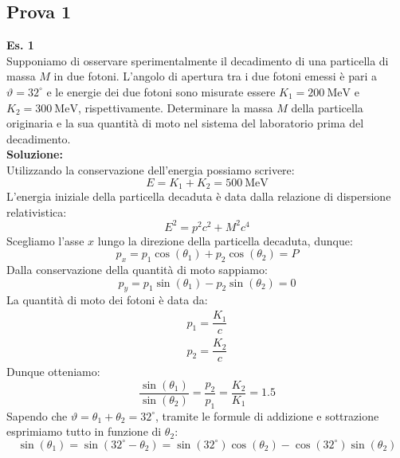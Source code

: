 \subsection{Prova 1}
\textbf{Es. 1}\\
Supponiamo di osservare sperimentalmente il decadimento di una particella di massa $M$ in due fotoni. L'angolo di apertura tra i due fotoni emessi è pari a $\vartheta = 32^\circ$ e le energie dei due fotoni
sono misurate essere $K_1 = \qty{200}{\mega\electronvolt}$ e $K_2 = \qty{300}{\mega\electronvolt}$, rispettivamente. Determinare la massa $M$ della particella originaria e la sua quantità di moto nel sistema del laboratorio prima del decadimento.\\
\textbf{Soluzione:}\\
Utilizzando la conservazione dell'energia possiamo scrivere:
\begin{equation}
    E = K_1 + K_2 = \qty{500}{\mega\electronvolt}
\end{equation}
L'energia iniziale della particella decaduta è data dalla relazione di dispersione relativistica:
\begin{equation}
    E^2 = p^2 c^2 + M^2 c^4
\end{equation}
Scegliamo l'asse $x$ lungo la direzione della particella decaduta, dunque:
\begin{equation}
    p_x = p_{1} \cos(\theta_1) + p_{2} \cos(\theta_2) = P
\end{equation}
Dalla conservazione della quantità di moto sappiamo:
\begin{equation}
    p_y = p_{1} \sin(\theta_1) - p_{2} \sin(\theta_2) = 0
\end{equation}
La quantità di moto dei fotoni è data da:
\begin{equation}
    \begin{split}
        p_{1} = \dfrac{K_{1}}{c} \\[8pt]
        p_{2} = \dfrac{K_{2}}{c}
    \end{split}
\end{equation}
Dunque otteniamo:
\begin{equation}
    \dfrac{\sin(\theta_1)}{\sin(\theta_2)} = \dfrac{p_{2}}{p_{1}} = \dfrac{K_{2}}{K_{1}} = 1.5
\end{equation}
Sapendo che $\vartheta = \theta_1 + \theta_2 = 32^\circ$, tramite le formule di addizione e sottrazione esprimiamo tutto in funzione di $\theta_2$:
\begin{equation}
    \sin(\theta_1) = \sin(32^\circ - \theta_2) = \sin(32^\circ) \cos(\theta_2) - \cos(32^\circ) \sin(\theta_2)
\end{equation}
